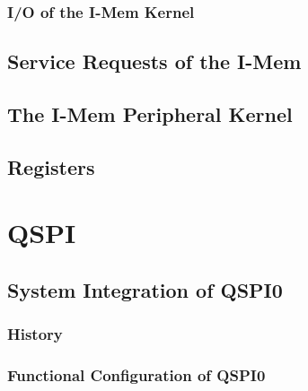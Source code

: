 \subsubsection{I/O of the I-Mem Kernel}

%
%
%
\subsection{Service Requests of the I-Mem}

\subsection{The I-Mem Peripheral Kernel}
\label{subsec:imemfunc02}

%
\subsection{Registers}


\section{QSPI}
\label{sec:qspifunc01}
\subsection{System Integration of QSPI0}
\subsubsection{History}


\subsubsection{Functional Configuration of QSPI0}


